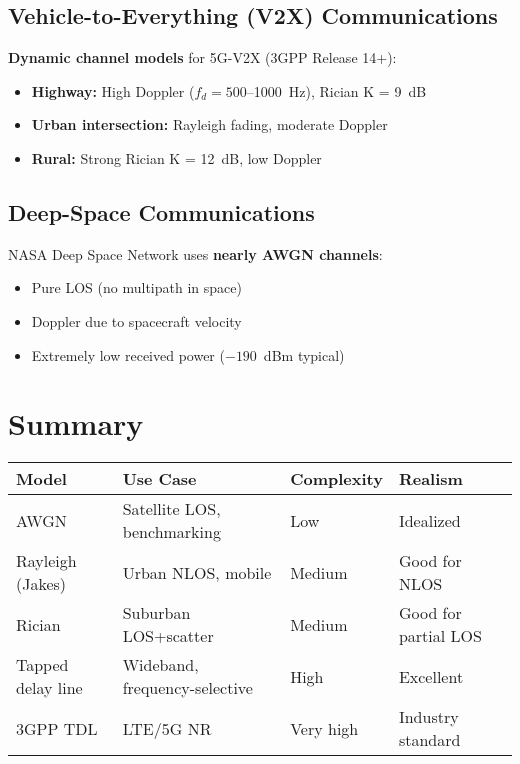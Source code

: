\subsection{Vehicle-to-Everything (V2X) Communications}

\textbf{Dynamic channel models} for 5G-V2X (3GPP Release 14+):
\begin{itemize}
\item \textbf{Highway:} High Doppler ($f_d = 500$--1000~Hz), Rician K = 9~dB
\item \textbf{Urban intersection:} Rayleigh fading, moderate Doppler
\item \textbf{Rural:} Strong Rician K = 12~dB, low Doppler
\end{itemize}

\subsection{Deep-Space Communications}

NASA Deep Space Network uses \textbf{nearly AWGN channels}:
\begin{itemize}
\item Pure LOS (no multipath in space)
\item Doppler due to spacecraft velocity
\item Extremely low received power ($-190$~dBm typical)
\end{itemize}

\section{Summary}

\begin{center}
\begin{tabular}{@{}p{3cm}p{4cm}p{3cm}p{3cm}@{}}
\toprule
\textbf{Model} & \textbf{Use Case} & \textbf{Complexity} & \textbf{Realism} \\
\midrule
AWGN & Satellite LOS, benchmarking & Low & Idealized \\
Rayleigh (Jakes) & Urban NLOS, mobile & Medium & Good for NLOS \\
Rician & Suburban LOS+scatter & Medium & Good for partial LOS \\
Tapped delay line & Wideband, frequency-selective & High & Excellent \\
3GPP TDL & LTE/5G NR & Very high & Industry standard \\
\bottomrule
\end{tabular}
\end{center}

